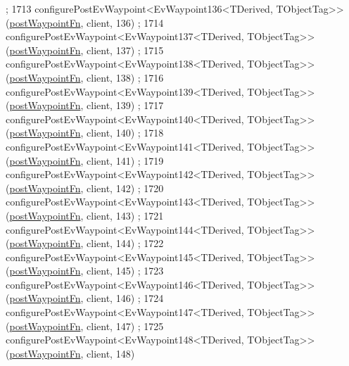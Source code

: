 \begin{DoxyCode}
      ;
1713     configurePostEvWaypoint<EvWaypoint136<TDerived, TObjectTag>>(\hyperlink{classmove__base__z__client_1_1WaypointEventDispatcher_acc538eb7506c13f7cca2268a1742dadd}{postWaypointFn}, client, 136)
      ;
1714     configurePostEvWaypoint<EvWaypoint137<TDerived, TObjectTag>>(\hyperlink{classmove__base__z__client_1_1WaypointEventDispatcher_acc538eb7506c13f7cca2268a1742dadd}{postWaypointFn}, client, 137)
      ;
1715     configurePostEvWaypoint<EvWaypoint138<TDerived, TObjectTag>>(\hyperlink{classmove__base__z__client_1_1WaypointEventDispatcher_acc538eb7506c13f7cca2268a1742dadd}{postWaypointFn}, client, 138)
      ;
1716     configurePostEvWaypoint<EvWaypoint139<TDerived, TObjectTag>>(\hyperlink{classmove__base__z__client_1_1WaypointEventDispatcher_acc538eb7506c13f7cca2268a1742dadd}{postWaypointFn}, client, 139)
      ;
1717     configurePostEvWaypoint<EvWaypoint140<TDerived, TObjectTag>>(\hyperlink{classmove__base__z__client_1_1WaypointEventDispatcher_acc538eb7506c13f7cca2268a1742dadd}{postWaypointFn}, client, 140)
      ;
1718     configurePostEvWaypoint<EvWaypoint141<TDerived, TObjectTag>>(\hyperlink{classmove__base__z__client_1_1WaypointEventDispatcher_acc538eb7506c13f7cca2268a1742dadd}{postWaypointFn}, client, 141)
      ;
1719     configurePostEvWaypoint<EvWaypoint142<TDerived, TObjectTag>>(\hyperlink{classmove__base__z__client_1_1WaypointEventDispatcher_acc538eb7506c13f7cca2268a1742dadd}{postWaypointFn}, client, 142)
      ;
1720     configurePostEvWaypoint<EvWaypoint143<TDerived, TObjectTag>>(\hyperlink{classmove__base__z__client_1_1WaypointEventDispatcher_acc538eb7506c13f7cca2268a1742dadd}{postWaypointFn}, client, 143)
      ;
1721     configurePostEvWaypoint<EvWaypoint144<TDerived, TObjectTag>>(\hyperlink{classmove__base__z__client_1_1WaypointEventDispatcher_acc538eb7506c13f7cca2268a1742dadd}{postWaypointFn}, client, 144)
      ;
1722     configurePostEvWaypoint<EvWaypoint145<TDerived, TObjectTag>>(\hyperlink{classmove__base__z__client_1_1WaypointEventDispatcher_acc538eb7506c13f7cca2268a1742dadd}{postWaypointFn}, client, 145)
      ;
1723     configurePostEvWaypoint<EvWaypoint146<TDerived, TObjectTag>>(\hyperlink{classmove__base__z__client_1_1WaypointEventDispatcher_acc538eb7506c13f7cca2268a1742dadd}{postWaypointFn}, client, 146)
      ;
1724     configurePostEvWaypoint<EvWaypoint147<TDerived, TObjectTag>>(\hyperlink{classmove__base__z__client_1_1WaypointEventDispatcher_acc538eb7506c13f7cca2268a1742dadd}{postWaypointFn}, client, 147)
      ;
1725     configurePostEvWaypoint<EvWaypoint148<TDerived, TObjectTag>>(\hyperlink{classmove__base__z__client_1_1WaypointEventDispatcher_acc538eb7506c13f7cca2268a1742dadd}{postWaypointFn}, client, 148)

\end{DoxyCode}
